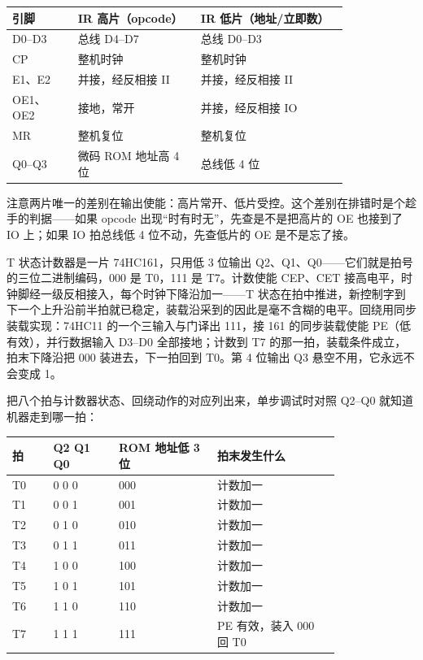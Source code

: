 \begin{longtable}{L{0.16\linewidth}L{0.30\linewidth}L{0.36\linewidth}}
\toprule
引脚 & IR 高片（opcode） & IR 低片（地址/立即数） \\
\midrule
D0–D3 & 总线 D4–D7 & 总线 D0–D3 \\\tablerowrule
CP & 整机时钟 & 整机时钟 \\\tablerowrule
E1、E2 & 并接，经反相接 II & 并接，经反相接 II \\\tablerowrule
OE1、OE2 & 接地，常开 & 并接，经反相接 IO \\\tablerowrule
MR & 整机复位 & 整机复位 \\\tablerowrule
Q0–Q3 & 微码 ROM 地址高 4 位 & 总线低 4 位 \\
\bottomrule
\end{longtable}

注意两片唯一的差别在输出使能：高片常开、低片受控。这个差别在排错时是个趁手的判据——如果 opcode 出现“时有时无”，先查是不是把高片的 OE 也接到了 IO 上；如果 IO 拍总线低 4 位不动，先查低片的 OE 是不是忘了接。

T 状态计数器是一片 74HC161，只用低 3 位输出 Q2、Q1、Q0——它们就是拍号的三位二进制编码，000 是 T0，111 是 T7。计数使能 CEP、CET 接高电平，时钟脚经一级反相接入，每个时钟下降沿加一——T 状态在拍中推进，新控制字到下一个上升沿前半拍就已稳定，装载沿采到的因此是毫不含糊的电平。回绕用同步装载实现：74HC11 的一个三输入与门译出 111，接 161 的同步装载使能 PE（低有效），并行数据输入 D3–D0 全部接地；计数到 T7 的那一拍，装载条件成立，拍末下降沿把 000 装进去，下一拍回到 T0。第 4 位输出 Q3 悬空不用，它永远不会变成 1。

把八个拍与计数器状态、回绕动作的对应列出来，单步调试时对照 Q2–Q0 就知道机器走到哪一拍：

\begin{longtable}{L{0.10\linewidth}L{0.16\linewidth}L{0.24\linewidth}L{0.30\linewidth}}
\toprule
拍 & Q2 Q1 Q0 & ROM 地址低 3 位 & 拍末发生什么 \\
\midrule
T0 & 0 0 0 & 000 & 计数加一 \\\tablerowrule
T1 & 0 0 1 & 001 & 计数加一 \\\tablerowrule
T2 & 0 1 0 & 010 & 计数加一 \\\tablerowrule
T3 & 0 1 1 & 011 & 计数加一 \\\tablerowrule
T4 & 1 0 0 & 100 & 计数加一 \\\tablerowrule
T5 & 1 0 1 & 101 & 计数加一 \\\tablerowrule
T6 & 1 1 0 & 110 & 计数加一 \\\tablerowrule
T7 & 1 1 1 & 111 & PE 有效，装入 000 回 T0 \\
\bottomrule
\end{longtable}

